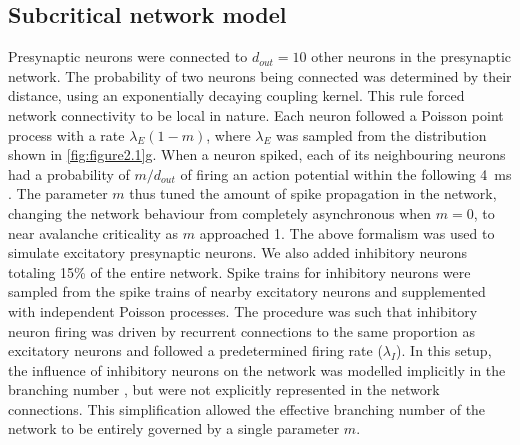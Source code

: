\subsection{Subcritical network model}
Presynaptic neurons were connected to $d_{out}=10$ other neurons in the presynaptic network. The probability of two neurons being connected was determined by their distance, using an exponentially decaying coupling kernel. This rule forced network connectivity to be local in nature. Each neuron followed a Poisson point process with a rate $\lambda_E (1-m)$, where $\lambda_E$ was sampled from the distribution shown in \autoref{fig:figure2.1}g. When a neuron spiked, each of its neighbouring neurons had a probability of $m/d_{out}$ of firing an action potential within the following \qty{4}{\milli\second} \cite{Wilting2019}. The parameter $m$ thus tuned the amount of spike propagation in the network, changing the network behaviour from completely asynchronous when $m=0$, to near avalanche criticality as $m$ approached 1. The above formalism was used to simulate excitatory presynaptic neurons. We also added inhibitory neurons totaling 15\% of the entire network. Spike trains for inhibitory neurons were sampled from the spike trains of nearby excitatory neurons and supplemented with independent Poisson processes. The procedure was such that inhibitory neuron firing was driven by recurrent connections to the same proportion as excitatory neurons and followed a predetermined firing rate ($\lambda_I$). In this setup, the influence of inhibitory neurons on the network was modelled implicitly in the branching number \cite{Li2020}, but were not explicitly represented in the network connections. This simplification allowed the effective branching number of the network to be entirely governed by a single parameter $m$. 

